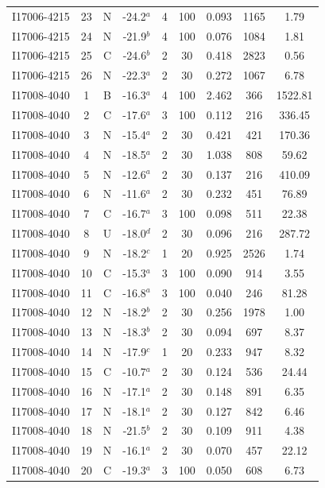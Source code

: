 \begin{table}
\begin{tabular}{ccccccccc}
I17006-4215 & 23 & N & -24.2$^{a}$ & 4 & 100 & 0.093 & 1165 & 1.79 \\
I17006-4215 & 24 & N & -21.9$^{b}$ & 4 & 100 & 0.076 & 1084 & 1.81 \\
I17006-4215 & 25 & C & -24.6$^{b}$ & 2 & 30 & 0.418 & 2823 & 0.56 \\
I17006-4215 & 26 & N & -22.3$^{a}$ & 2 & 30 & 0.272 & 1067 & 6.78 \\
I17008-4040 & 1 & B & -16.3$^{a}$ & 4 & 100 & 2.462 & 366 & 1522.81 \\
I17008-4040 & 2 & C & -17.6$^{a}$ & 3 & 100 & 0.112 & 216 & 336.45 \\
I17008-4040 & 3 & N & -15.4$^{a}$ & 2 & 30 & 0.421 & 421 & 170.36 \\
I17008-4040 & 4 & N & -18.5$^{a}$ & 2 & 30 & 1.038 & 808 & 59.62 \\
I17008-4040 & 5 & N & -12.6$^{a}$ & 2 & 30 & 0.137 & 216 & 410.09 \\
I17008-4040 & 6 & N & -11.6$^{a}$ & 2 & 30 & 0.232 & 451 & 76.89 \\
I17008-4040 & 7 & C & -16.7$^{a}$ & 3 & 100 & 0.098 & 511 & 22.38 \\
I17008-4040 & 8 & U & -18.0$^{d}$ & 2 & 30 & 0.096 & 216 & 287.72 \\
I17008-4040 & 9 & N & -18.2$^{c}$ & 1 & 20 & 0.925 & 2526 & 1.74 \\
I17008-4040 & 10 & C & -15.3$^{a}$ & 3 & 100 & 0.090 & 914 & 3.55 \\
I17008-4040 & 11 & C & -16.8$^{a}$ & 3 & 100 & 0.040 & 246 & 81.28 \\
I17008-4040 & 12 & N & -18.2$^{b}$ & 2 & 30 & 0.256 & 1978 & 1.00 \\
I17008-4040 & 13 & N & -18.3$^{b}$ & 2 & 30 & 0.094 & 697 & 8.37 \\
I17008-4040 & 14 & N & -17.9$^{c}$ & 1 & 20 & 0.233 & 947 & 8.32 \\
I17008-4040 & 15 & C & -10.7$^{a}$ & 2 & 30 & 0.124 & 536 & 24.44 \\
I17008-4040 & 16 & N & -17.1$^{a}$ & 2 & 30 & 0.148 & 891 & 6.35 \\
I17008-4040 & 17 & N & -18.1$^{a}$ & 2 & 30 & 0.127 & 842 & 6.46 \\
I17008-4040 & 18 & N & -21.5$^{b}$ & 2 & 30 & 0.109 & 911 & 4.38 \\
I17008-4040 & 19 & N & -16.1$^{a}$ & 2 & 30 & 0.070 & 457 & 22.12 \\
I17008-4040 & 20 & C & -19.3$^{a}$ & 3 & 100 & 0.050 & 608 & 6.73 \\

\end{tabular}
\end{table}

